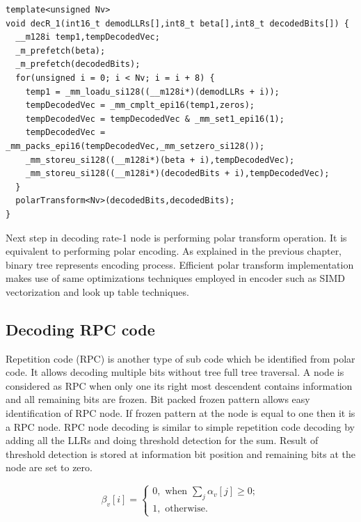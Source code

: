 \begin{code}
	\label{code:rateOneNodeDecoding}
	\begin{verbatim}
template<unsigned Nv>
void decR_1(int16_t demodLLRs[],int8_t beta[],int8_t decodedBits[]) {
  __m128i temp1,tempDecodedVec;
  _m_prefetch(beta);
  _m_prefetch(decodedBits);
  for(unsigned i = 0; i < Nv; i = i + 8) {
    temp1 = _mm_loadu_si128((__m128i*)(demodLLRs + i));
    tempDecodedVec = _mm_cmplt_epi16(temp1,zeros);
    tempDecodedVec = tempDecodedVec & _mm_set1_epi16(1);
    tempDecodedVec = _mm_packs_epi16(tempDecodedVec,_mm_setzero_si128());
    _mm_storeu_si128((__m128i*)(beta + i),tempDecodedVec);
    _mm_storeu_si128((__m128i*)(decodedBits + i),tempDecodedVec);
  }
  polarTransform<Nv>(decodedBits,decodedBits);
}
\end{verbatim}
\end{code}

Next step in decoding rate-1 node is performing polar transform operation. It is equivalent to performing polar encoding. As explained in the previous chapter, binary tree represents encoding process. Efficient polar transform implementation makes use of same optimizations techniques employed in encoder such as SIMD vectorization and look up table techniques.

\subsection{Decoding RPC code}
Repetition code (RPC) is another type of sub code which be identified from polar code. It allows decoding multiple bits without tree full tree traversal. A node is considered as RPC when only one its right most descendent contains information and all remaining bits are frozen. Bit packed frozen pattern allows easy identification of RPC node. If frozen pattern at the node is equal to one then it is a RPC node. RPC node decoding is similar to simple repetition code decoding by adding all the LLRs and doing threshold detection for the sum.  Result of threshold detection is stored at information bit position and remaining bits at the node are set to zero.

\begin{equation*}
 \beta_{v}[i] = \begin{cases}
				0, \text{ when $\sum_{j} \alpha_{v}[j] \geq 0 ;$}  \\
				1, \text{ otherwise.}
				\end{cases}
\end{equation*}

